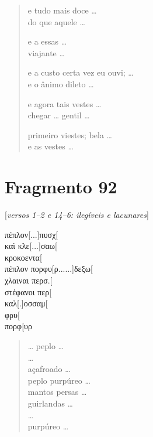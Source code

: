{\begin{verse}
e tudo mais doce \ldots{}\\
do que aquele \ldots{}

e a essas \ldots{}\\
viajante \ldots{}

e a custo certa vez eu ouvi; \ldots{}\\
e o ânimo dileto \ldots{}

e agora tais vestes \ldots{}\\ 
chegar \ldots{} gentil \ldots{}

primeiro viestes; bela \ldots{}\\ \EP[1]
e as vestes \ldots{}
\end{verse}

\medskip



\section{Fragmento 92} 

\begin{gkverse}
\textnormal{[\textit{versos 1--2 e 14--6: ilegíveis e lacunares}]}

πέπλον[...]πυσχ[\\
καὶ κλε[...]σαω[\\
κροκοεντα[\\
πέπλον πορφυ[ρ......]δεξω[\\
χλαιναι περσ.[\\
στέφανοι περ[\\
καλ[.]οσσαμ[\\
φρυ[\\
πορφ[υρ
\end{gkverse}

\begin{verse}
\ldots{} peplo \ldots{}\\ 
\ldots{}\\
açafroado \ldots{}\\
peplo purpúreo \ldots{}\\
mantos persas \ldots{}\\
guirlandas \ldots{}\\
\ldots{}\\
purpúreo \ldots{}
\end{verse}

}
